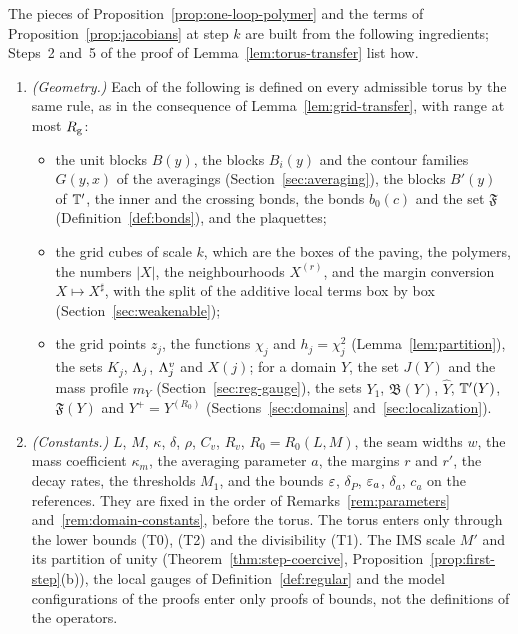 \begin{lemma}\label{lem:local-inventory}
The pieces of Proposition~\ref{prop:one-loop-polymer} and the terms of Proposition~\ref{prop:jacobians} at step $k$ are built from the following ingredients; Steps~2 and~5 of the proof of Lemma~\ref{lem:torus-transfer} list how.
\begin{enumerate}[label=(\alph*)]
\item \emph{(Geometry.)} Each of the following is defined on every admissible torus by the same rule, as in the consequence of Lemma~\ref{lem:grid-transfer}, with range at most $R_{\rm g}$:
  \begin{itemize}
  \item the unit blocks $B(y)$, the blocks $B_i(y)$ and the contour families $G(y,x)$ of the averagings (Section~\ref{sec:averaging}), the blocks $B'(y)$ of $\mathbb T'$, the inner and the crossing bonds, the bonds $b_0(c)$ and the set $\mathfrak F$ (Definition~\ref{def:bonds}), and the plaquettes;
  \item the grid cubes of scale $k$, which are the boxes of the paving, the polymers, the numbers $|X|$, the neighbourhoods $X^{(r)}$, and the margin conversion $X\mapsto X^\sharp$, with the split of the additive local terms box by box (Section~\ref{sec:weakenable});
  \item the grid points $z_j$, the functions $\chi_j$ and $h_j=\chi_j^2$ (Lemma~\ref{lem:partition}), the sets $K_j$, $\Lambda_j$, $\Lambda^v_j$ and $X(j)$; for a domain $Y$, the set $J(Y)$ and the mass profile $m_Y$ (Section~\ref{sec:reg-gauge}), the sets $Y_1$, $\mathfrak B(Y)$, $\hat Y$, $\mathbb T'(Y)$, $\mathfrak F(Y)$ and $Y^+=Y^{(R_0)}$ (Sections~\ref{sec:domains} and~\ref{sec:localization}).
  \end{itemize}
\item \emph{(Constants.)} $L$, $M$, $\kappa$, $\delta$, $\rho$, $C_v$, $R_v$, $R_0=R_0(L,M)$, the seam widths $w$, the mass coefficient $\kappa_m$, the averaging parameter $a$, the margins $r$ and $r'$, the decay rates, the thresholds $M_1$, and the bounds $\varepsilon$, $\delta_P$, $\varepsilon_a$, $\delta_a$, $c_a$ on the references. They are fixed in the order of Remarks~\ref{rem:parameters} and~\ref{rem:domain-constants}, before the torus. The torus enters only through the lower bounds (T0), (T2) and the divisibility (T1). The IMS scale $M'$ and its partition of unity (Theorem~\ref{thm:step-coercive}, Proposition~\ref{prop:first-step}(b)), the local gauges of Definition~\ref{def:regular} and the model configurations of the proofs enter only proofs of bounds, not the definitions of the operators.

\end{enumerate}
\end{lemma}
